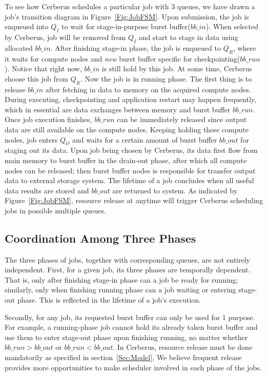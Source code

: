 To see how Cerberus schedules a particular job with 3 queues,
we have drawn a job's transition diagram in Figure~\ref{Fig:JobFSM}.
Upon submission, the job is enqueued into $Q_I$ to wait for stage-in-purpose burst buffer($bb\_in$).
When selected by Cerberus, job will be removed from $Q_I$ and
start to stage in data using allocated $bb\_in$.
After finishing stage-in phase, the job is enqueued to $Q_R$, where it waits for
compute nodes and \textit{new} burst buffer specific for checkpointing($bb\_run$).
Notice that right now, $bb\_in$ is still hold by this job.
At some time, Cerberus choose this job from $Q_R$.
Now the job is in running phase.
The first thing is to release $bb\_in$ after fetching in data to memory on the acquired compute nodes.
During executing, checkpointing and application restart may happen frequently, which in essential
are data exchanges between memory and burst buffer $bb\_run$.
Once job execution finishes, $bb\_run$ can be immediately released since
output data are still available on the compute nodes.
Keeping holding these compute nodes, job enters $Q_O$ and waits for a certain amount of burst
buffer $bb\_out$ for staging out its data.
Upon job being chosen by Cerberus, its data first flow from main memory to burst buffer
in the drain-out phase, after which all compute nodes can be released;
then burst buffer nodes is responsible for transfer output data to external storage system.
The lifetime of a job concludes when all useful data results are stored
and $bb\_out$ are returned to system.
As indicated by Figure~\ref{Fig:JobFSM}, resource release at anytime will trigger Cerberus
scheduling jobs in possible multiple queues.


\subsection{Coordination Among Three Phases}
The three phases of jobs, together with corresponding queues, are not entirely independent.
First, for a given job, its three phases are temporally dependent.
That is, only after finishing stage-in phase can a job be ready for running;
similarly, only when finishing running phase can a job waiting or entering stage-out phase.
This is reflected in the lifetime of a job's execution.

Secondly, for any job,
its requested burst buffer can only be used for 1 purpose.
For example, a running-phase job cannot hold its already taken burst buffer
and use them to enter stage-out phase upon finishing running,
no matter whether $bb\_run > bb\_out$ or $bb\_run < bb\_out$.
In Cerberus, resource release must be done mandatorily as specified in section~\ref{Sec:Model},
We believe frequent release provides more opportunities to make scheduler involved in each phase of the jobs.

